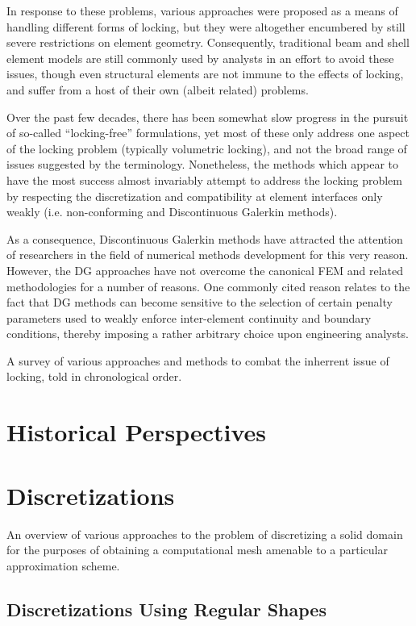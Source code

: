 In response to these problems, various approaches were proposed as a means of handling different forms of locking, but they were altogether encumbered by still severe restrictions on element geometry. Consequently, traditional beam and shell element models are still commonly used by analysts in an effort to avoid these issues, though even structural elements are not immune to the effects of locking, and suffer from a host of their own (albeit related) problems.

Over the past few decades, there has been somewhat slow progress in the pursuit of so-called ``locking-free'' formulations, yet most of these only address one aspect of the locking problem (typically volumetric locking), and not the broad range of issues suggested by the terminology. Nonetheless, the methods which appear to have the most success almost invariably attempt to address the locking problem by respecting the discretization and compatibility at element interfaces only weakly (i.e. non-conforming and Discontinuous Galerkin methods).

As a consequence, Discontinuous Galerkin methods have attracted the attention of researchers in the field of numerical methods development for this very reason. However, the DG approaches have not overcome the canonical FEM and related methodologies for a number of reasons. One commonly cited reason relates to the fact that DG methods can become sensitive to the selection of certain penalty parameters used to weakly enforce inter-element continuity and boundary conditions, thereby imposing a rather arbitrary choice upon engineering analysts.

A survey of various approaches and methods to combat the inherrent issue of locking, told in chronological order.

\section{Historical Perspectives}

\section{Discretizations}
%
An overview of various approaches to the problem of discretizing a solid domain for the purposes of obtaining a computational mesh amenable to a particular approximation scheme.
\subsection{Discretizations Using Regular Shapes}

